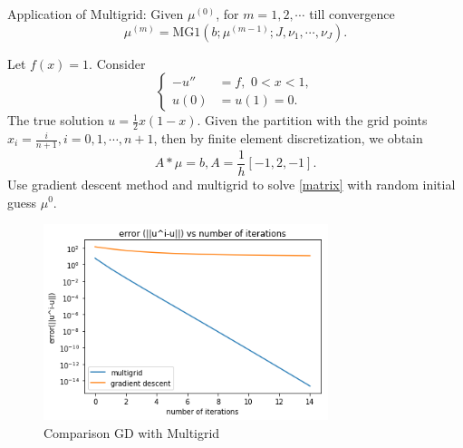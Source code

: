 Application of Multigrid:
		Given $\mu^{(0)}$, for $m=1,2,\cdots$ till convergence
		$$
		\mu^{(m)}= {\text{MG1}}(b; \mu^{{(m-1)}}; J,\nu_1, \cdots, \nu_J).
		$$
		
\example Let $f(x)=1$. Consider 
\begin{equation}\label{1Dposi}
\left\{
\begin{aligned}
-u''&= f, \,\, 0<x<1, \\
 u(0)&=u(1)=0.
\end{aligned}
\right.
\end{equation}
The true solution $u=\frac12 x(1-x)$. Given the partition with the grid points 
$x_i=\frac{i}{n+1}, i=0,1,\cdots,n+1$, then by finite element discretization, 
we obtain 
\begin{equation}\label{matrix}
A\ast \mu =b, A=\frac{1}{h}[-1,2,-1].
\end{equation}
Use gradient descent method and multigrid to solve \eqref{matrix} with random initial guess $\mu^0$.



\begin{figure}[!ht]
\centering
\setlength{\abovecaptionskip}{0pt}
\setlength{\belowcaptionskip}{0pt}
\includegraphics[width=8.3cm]{figures/mgcompare.png}
\caption{Comparison GD with Multigrid}
\label{fig:Hmesh}
\end{figure}





